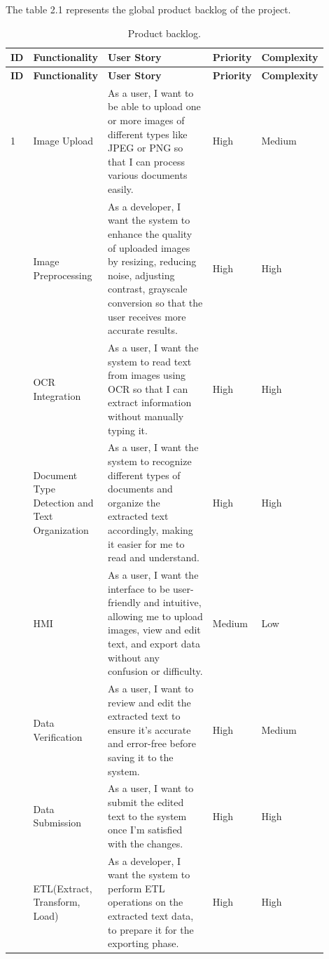 The table 2.1 represents the global product backlog of the project.
\begin{longtable}{|>{\centering\arraybackslash}m{0.05\linewidth}|>{\centering\arraybackslash}m{0.15\linewidth}|>{\centering\arraybackslash}m{0.45\linewidth}|>{\centering\arraybackslash}m{0.1\linewidth}|>{\centering\arraybackslash}m{0.15\linewidth}|}
\caption{Product backlog.} \label{tab:product_backlog} \\
\hline
\textbf{ID} & \textbf{Functionality} & \textbf{User Story} & \textbf{Priority} & \textbf{Complexity} \\ \hline
\endfirsthead
\hline
\textbf{ID} & \textbf{Functionality} & \textbf{User Story} & \textbf{Priority} & \textbf{Complexity} \\ \hline
\endhead
\hline
\endfoot
\endlastfoot

1 & Image Upload & As a user, I want to be able to upload one or more images of different types like JPEG or PNG so that I can process various documents easily. & High & Medium \\ \hline
2 & Image Preprocessing & As a developer, I want the system to enhance the quality of uploaded images by resizing, reducing noise, adjusting contrast, grayscale conversion so that the user receives more accurate results. & High & High \\ \hline
3 & OCR Integration & As a user, I want the system to read text from images using OCR so that I can extract information without manually typing it. & High & High \\ \hline
4 & Document Type Detection and Text Organization & As a user, I want the system to recognize different types of documents and organize the extracted text accordingly, making it easier for me to read and understand. & High & High \\ \hline
5 & HMI & As a user, I want the interface to be user-friendly and intuitive, allowing me to upload images, view and edit text, and export data without any confusion or difficulty. & Medium & Low \\ \hline
6 & Data Verification & As a user, I want to review and edit the extracted text to ensure it's accurate and error-free before saving it to the system. & High & Medium \\ \hline
7 & Data Submission & As a user, I want to submit the edited text to the system once I'm satisfied with the changes. & High & High \\ \hline
8 & ETL(Extract, Transform, Load) & As a developer, I want the system to perform ETL operations on the extracted text data, to prepare it for the exporting phase. & High & High \\ \hline

\end{longtable}
